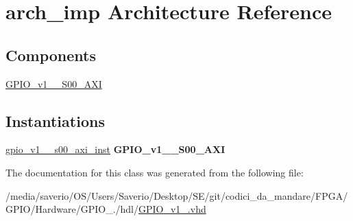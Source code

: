 \hypertarget{classGPIO__v1__0_1_1arch__imp}{}\section{arch\+\_\+imp Architecture Reference}
\label{classGPIO__v1__0_1_1arch__imp}
\subsection*{Components}
 \begin{DoxyCompactItemize}
\item 
\mbox{\label{classGPIO__v1__0_1_1arch__imp_acfa88fcc633c72af8bfd7e652932f7c7}} 
\hyperlink{classGPIO__v1__0_1_1arch__imp_acfa88fcc633c72af8bfd7e652932f7c7}{G\+P\+I\+O\+\_\+v1\+\_\+\_\+\+S00\+\_\+\+A\+XI}  {\bfseries }  
\end{DoxyCompactItemize}
\subsection*{Instantiations}
 \begin{DoxyCompactItemize}
\item 
\mbox{\label{classGPIO__v1__0_1_1arch__imp_add7a292f6a3530426561c0d1bf9540b4}} 
\hyperlink{classGPIO__v1__0_1_1arch__imp_add7a292f6a3530426561c0d1bf9540b4}{gpio\+\_\+v1\+\_\+\_\+s00\+\_\+axi\+\_\+inst}  {\bfseries G\+P\+I\+O\+\_\+v1\+\_\+\_\+\+S00\+\_\+\+A\+XI}   
\end{DoxyCompactItemize}


The documentation for this class was generated from the following file\+:\begin{DoxyCompactItemize}
\item 
/media/saverio/\+O\+S/\+Users/\+Saverio/\+Desktop/\+S\+E/git/codici\+\_\+da\+\_\+mandare/\+F\+P\+G\+A/\+G\+P\+I\+O/\+Hardware/\+G\+P\+I\+O\+\_./hdl/\hyperlink{GPIO__v1__0_8vhd}{G\+P\+I\+O\+\_\+v1\+\_.\+vhd}\end{DoxyCompactItemize}
